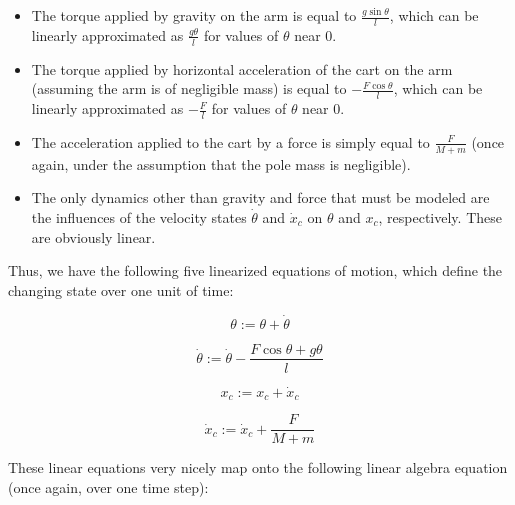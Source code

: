 \documentclass[12pt]{article}
\begin{document}
\begin{itemize}
    \item The torque applied by gravity on the arm is equal to $\displaystyle \frac{\displaystyle g \sin \theta}{\displaystyle l}$, which can be linearly approximated as $\displaystyle \frac{\displaystyle g \theta}{\displaystyle l}$ for values of $\theta$ near 0.
    \item The torque applied by horizontal acceleration of the cart on the arm (assuming the arm is of negligible mass) is equal to $\displaystyle - \frac{\displaystyle F \cos \theta}{\displaystyle l}$, which can be linearly approximated as $\displaystyle - \frac{\displaystyle F}{\displaystyle l}$ for values of $\theta$ near 0.
    \item The acceleration applied to the cart by a force is simply equal to $\displaystyle \frac{\displaystyle F}{\displaystyle M + m}$ (once again, under the assumption that the pole mass is negligible).
    \item The only dynamics other than gravity and force that must be modeled are the influences of the velocity states $\dot \theta$ and $\dot x _c$ on $\theta$ and $x _c$, respectively. These are obviously linear.
\end{itemize}

Thus, we have the following five linearized equations of motion, which define the changing state over one unit of time:

\begin{equation}
    \displaystyle \theta := \theta + \dot \theta
\end{equation}

\begin{equation}
    \displaystyle \dot \theta := \dot \theta - \frac{\displaystyle F \cos \theta + g \theta}{\displaystyle l}
\end{equation}

\begin{equation}
    \displaystyle x _c := x _c + \dot x _c
\end{equation}

\begin{equation}
    \dot x _c := \displaystyle \dot x _c + \frac{\displaystyle F}{\displaystyle M + m}
\end{equation}

These linear equations very nicely map onto the following linear algebra equation (once again, over one time step):
\end{document}
